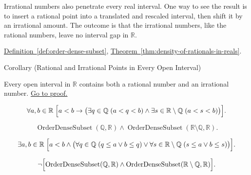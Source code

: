 \begin{remark*}[Interpretation]
Irrational numbers also penetrate every real interval. One way to see the result is to insert a rational point into a translated and rescaled interval, then shift it by an irrational amount. The outcome is that the irrational numbers, like the rational numbers, leave no interval gap in $\mathbb{R}$.
\end{remark*}

\begin{dependencies}
\hyperref[def:order-dense-subset]{Definition~\ref*{def:order-dense-subset}},
\hyperref[thm:density-of-rationals-in-reals]{Theorem~\ref*{thm:density-of-rationals-in-reals}}.
\end{dependencies}





\begin{corollarybox}{Corollary (Rational and Irrational Points in Every Open Interval)}
\begin{corollary}
\label{cor:every-open-interval-contains-rational-and-irrational}
Every open interval in $\mathbb{R}$ contains both a rational number and an irrational number.
\hyperref[prf:every-open-interval-contains-rational-and-irrational]{Go to proof.}
\end{corollary}
\end{corollarybox}

\begin{remark*}
\[
\forall a,b\in\mathbb{R}\;
\Bigl[
a<b\rightarrow
\bigl(\exists q\in\mathbb{Q}\;(a<q<b)\land \exists s\in\mathbb{R}\setminus\mathbb{Q}\;(a<s<b)\bigr)
\Bigr].
\]
\end{remark*}

\begin{remark*}
\[
\operatorname{OrderDenseSubset}(\mathbb{Q},\mathbb{R})
\land
\operatorname{OrderDenseSubset}(\mathbb{R}\setminus\mathbb{Q},\mathbb{R}).
\]
\end{remark*}

\begin{remark*}
\[
\exists a,b\in\mathbb{R}\;
\Bigl[
a<b\land
\bigl(
\forall q\in\mathbb{Q}\;(q\le a\lor b\le q)
\lor
\forall s\in\mathbb{R}\setminus\mathbb{Q}\;(s\le a\lor b\le s)
\bigr)
\Bigr].
\]
\end{remark*}

\begin{remark*}
\[
\neg\Bigl[
\operatorname{OrderDenseSubset}(\mathbb{Q},\mathbb{R})
\land
\operatorname{OrderDenseSubset}(\mathbb{R}\setminus\mathbb{Q},\mathbb{R})
\Bigr].
\]
\end{remark*}

